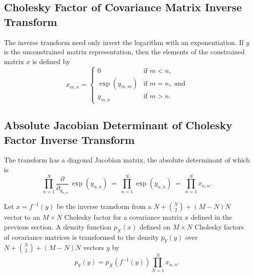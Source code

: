 \subsection{Cholesky Factor of Covariance Matrix Inverse Transform}

The inverse transform need only invert the logarithm with an
exponentiation.  If $y$ is the unconstrained matrix representation,
then the elements of the constrained matrix $x$ is defined by
\[
x_{m,n} =
\left\{
\begin{array}{cl}
0 & \mbox{if } m < n,
\\[4pt]
\exp(y_{m,m}) & \mbox{if } m = n, \mbox{ and}
\\[4pt]
y_{m,n} & \mbox{if } m > n.
\end{array}
\right.
\]

\subsection{Absolute Jacobian Determinant of Cholesky Factor Inverse Transform}

The transform has a diagonal Jacobian matrix, the absolute determinant
of which is
%
\[
\prod_{n=1}^N  \frac{\partial}{\partial_{y_{n,n}}} \, \exp(y_{n,n})
\ = \ 
\prod_{n=1}^N \exp(y_{n,n})
\ = \
\prod_{n=1}^N x_{n,n}.
\]

Let $x = f^{-1}(y)$ be the inverse transform from a $N + \binom{N}{2}
+ (M - N)N$ vector to an $M \times N$ Cholesky factor for a covariance
matrix $x$ defined in the previous section.  A density function
$p_X(x)$ defined on $M \times N$ Cholesky factors of covariance
matrices is transformed to the density $p_Y(y)$ over $N + \binom{N}{2}
+ (M - N)N$ vectors $y$ by
%
\[
p_Y(y) = p_X(f^{-1}(y)) \prod_{N=1}^N x_{n,n}.
\]




